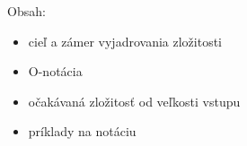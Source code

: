 %





Obsah:
\begin{itemize}
    \item cieľ a zámer vyjadrovania zložitosti
    \item O-notácia
    \item očakávaná zložitosť od veľkosti vstupu
    \item príklady na notáciu
\end{itemize}


